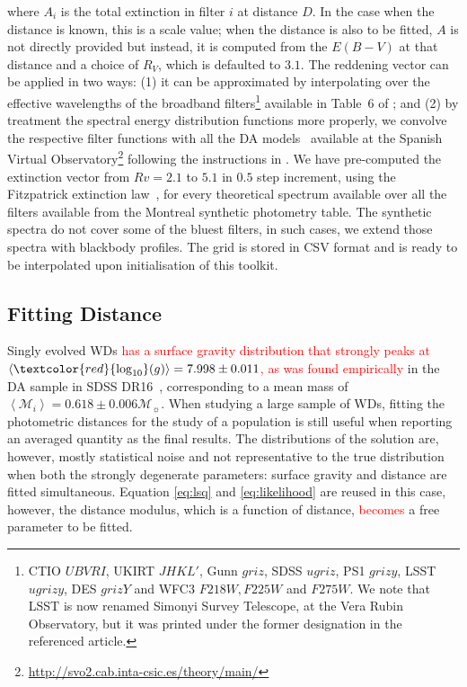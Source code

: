 \documentclass[fleqn,usenatbib]{rasti}
\newcommand{\msun}{\mathcal{M}_{\sun}}
\begin{document}
where $A_i$ is the total extinction in filter $i$ at distance $D$. In the case
when the distance is known, this is a scale value; when the distance is also
to be fitted, $A$ is not directly provided but instead, it is computed from the
$E(B-V)$ at that distance and a choice of $R_{V}$, which is defaulted to $3.1$.
The reddening vector can be applied in two ways: (1) it can be approximated by
interpolating over the effective wavelengths of the broadband
filters\footnote{CTIO $UBVRI$, UKIRT $JHKL'$, Gunn $griz$, SDSS $ugriz$,
PS1 $grizy$, LSST $ugrizy$, DES $grizY$ and WFC3 $F218W, F225W$ and $F275W$.
We note that LSST is now renamed Simonyi Survey Telescope, at the Vera Rubin
Observatory, but it was printed under the former designation in the referenced
article.} available in Table~6 of \citet{2011ApJ...737..103S}; and (2) by
treatment the spectral energy distribution functions more properly, we convolve
the respective filter functions with all the DA
models~\citep{2009ApJ...696.1755T, 2010MmSAI..81..921K} available at the
Spanish Virtual
Observatory\footnote{\url{http://svo2.cab.inta-csic.es/theory/main/}} following
the instructions in \citet{2011ApJ...737..103S}. We have pre-computed the
extinction vector from $Rv = 2.1$ to $5.1$ in $0.5$ step increment, using the
Fitzpatrick extinction law~\citep{1999PASP..111...63F}, for every theoretical
spectrum available over all the filters available from the Montreal synthetic
photometry table. The synthetic spectra do not cover some of the bluest filters,
in such cases, we extend those spectra with blackbody profiles. The grid is
stored in CSV format and is ready to be interpolated upon initialisation of
this toolkit.

\subsection{Fitting Distance}
Singly evolved WDs \textcolor{red}{has a surface gravity distribution that
strongly peaks at $\left<\textcolor{red}{\log_{10}}(g)\right> = 7.998 \pm 0.011$,
as was found empirically} in the DA sample in SDSS DR16~\citep{2021MNRAS.507.4646K},
corresponding to a mean mass of $\left<\mathcal{M}_i\right> = 0.618 \pm 0.006 \msun$.
When studying a large sample of WDs,
fitting the photometric distances for the study of a population is still
useful when reporting an averaged quantity as the final results. The
distributions of the solution are, however, mostly statistical noise and not
representative to the true distribution when both the strongly degenerate
parameters: surface gravity and distance are fitted simultaneous. Equation
\ref{eq:lsq} and \ref{eq:likelihood} are reused in this case, however, the
distance modulus, which is a function of distance, \textcolor{red}{becomes}
a free parameter to be fitted.
\end{document}
